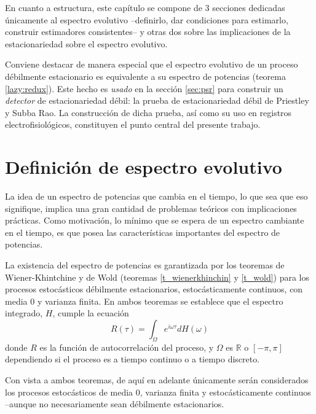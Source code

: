 \documentclass[12pt,letterpaper]{book}
\newcommand{\R}{\mathbb{R}}
\begin{document}
En cuanto a estructura, este capítulo se compone de 3 secciones dedicadas únicamente al espectro evolutivo --definirlo, dar condiciones para estimarlo, construir estimadores consistentes-- y otras dos sobre las implicaciones de la estacionariedad sobre el espectro evolutivo.

Conviene destacar de manera especial que el espectro evolutivo de un proceso débilmente estacionario es equivalente a su espectro de potencias (teorema \ref{lazy:redux}). Este hecho es \textit{usado} en la sección \ref{sec:psr} para construir un \textit{detector} de estacionariedad débil: la prueba de estacionariedad débil de Priestley y Subba Rao.
%
La construcción de dicha prueba, así como su uso en registros electrofisiológicos, constituyen el punto central del presente trabajo.


\section{Definición de espectro evolutivo}
\label{sec:espectro}

La idea de un espectro de potencias que cambia en el tiempo, lo que sea que eso signifique, implica una gran cantidad de problemas teóricos con implicaciones prácticas.
%
Como motivación, lo mínimo que se espera de un espectro cambiante en el tiempo, es que posea las características importantes del espectro de potencias.

La existencia del espectro de potencias es garantizada por los teoremas de Wiener-Khintchine y de Wold (teoremas \ref{t_wienerkhinchin} y \ref{t_wold}) para los procesos estocásticos débilmente estacionarios, estocásticamente continuos, con media 0 y varianza finita.
%
En ambos teoremas se establece que el espectro integrado, $H$, cumple la ecuación
\begin{equation}
R(\tau) = \int_\Omega e^{i \omega \tau} dH(\omega)
\label{lazy1}
\end{equation}
donde $R$ es la función de autocorrelación del proceso, y $\Omega$ es $\R$ o $[-\pi,\pi]$ dependiendo si el proceso es a tiempo continuo o a tiempo discreto.

Con vista a ambos teoremas, de aquí en adelante únicamente serán considerados los procesos estocásticos de media 0, varianza finita y estocásticamente continuos --aunque no necesariamente sean débilmente estacionarios.
\end{document}

